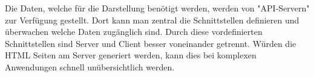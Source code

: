 Die Daten, welche für die Darstellung benötigt werden, werden von "API-Servern" zur Verfügung gestellt. Dort kann man zentral die Schnittstellen definieren und überwachen welche Daten zugänglich sind. Durch diese vordefinierten Schnittstellen sind Server und Client besser voneinander getrennt. Würden die HTML Seiten am Server generiert werden, kann dies bei komplexen Anwendungen schnell unübersichtlich werden.

